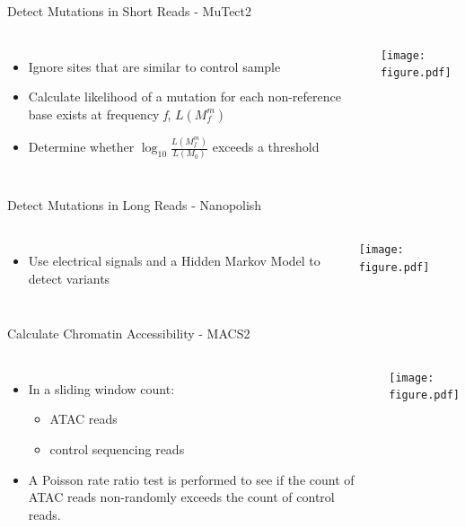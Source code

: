 \documentclass{beamer}
\begin{document}
\begin{frame}{Detect Mutations in Short Reads - MuTect2}
\begin{columns}
\begin{itemize}
	\item Ignore sites that are similar to control sample
	\item Calculate likelihood of a mutation for each non-reference base exists at frequency \textit{f}, $L(M^m_f)$
	\item Determine whether $\log_{10} \frac{L(M^m_f)}{L(M_0)}$ exceeds a threshold
\end{itemize}
\texttt{[image: figure.pdf]}
\end{columns}
\end{frame}

\begin{frame}{Detect Mutations in Long Reads - Nanopolish}
\begin{columns}
\begin{itemize}
	\item Use electrical signals and a Hidden Markov Model to detect variants
\end{itemize}
\centering
\texttt{[image: figure.pdf]}
\end{columns}
\end{frame}

\begin{frame}{Calculate Chromatin Accessibility - MACS2}
\begin{columns}
\begin{itemize}
	\item In a sliding window count:
	\begin{itemize}
		\item ATAC reads
		\item control sequencing reads
	\end{itemize}
	\item A Poisson rate ratio test is performed to see if the count of ATAC reads non-randomly exceeds the count of control reads.
\end{itemize}
\texttt{[image: figure.pdf]}
\end{columns}
\end{frame}
\end{document}
